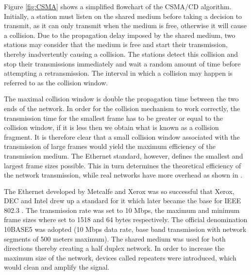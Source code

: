 
Figure \ref{fig:CSMA} shows a simplified flowchart of the CSMA/CD algorithm. Initially, a station must listen on the shared medium before taking a decision to transmit, as it can only transmit when the medium is free, otherwise it will cause a collision. Due to the propagation delay imposed by the shared medium, two stations may consider that the medium is free and start their transmission, thereby inadvertently causing a collision. The stations detect this collision and stop their transmissions immediately and wait a random amount of time before attempting a retransmission. The interval in which a collision may happen is referred  to as the collision window.

The maximal collision window is double the propagation time between the two ends of the network. In order for the collision mechanism to work correctly, the transmission time for the smallest frame has to be greater or equal to the collision window, if it is less then we obtain what is known as a collision fragment. It is therefore clear that a small collision window associated with the transmission of large frames would yield the maximum efficiency of the transmission medium. The Ethernet standard, however, defines the smallest and largest frame sizes possible. This in turn determines the theoretical efficiency of the network transmission, while real networks have more overhead as shown in \cite{EtherCapa}.

The Ethernet developed by Metcalfe and Xerox was so successful that Xerox, DEC and Intel drew up a standard for it which later became the base for IEEE 802.3 \cite{IEEE802.3, EtherGuide}. The transmission rate was set to 10 Mbps, the maximum and minimum frame sizes where set to 1518 and 64 bytes respectively. The official denomination 10BASE5 was adopted (10 Mbps data rate, base band transmission with network segments of 500 meters maximum). The shared medium was used for both directions thereby creating a half duplex network. In order to increase the maximum size of the network, devices called repeaters were introduced, which would clean and amplify the signal. 


